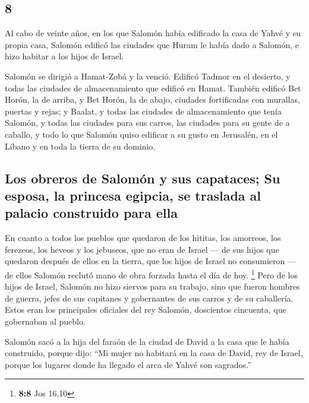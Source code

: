 \begin{paracol}{2}
\hypertarget{section-14}{%
\section{8}\label{section-14}}

 Al cabo de veinte años, en los que Salomón había
edificado la casa de Yahvé y su propia casa,  Salomón
edificó las ciudades que Huram le había dado a Salomón, e hizo habitar a
los hijos de Israel.

 Salomón se dirigió a Hamat-Zobá y la venció.
 Edificó Tadmor en el desierto, y todas las ciudades de
almacenamiento que edificó en Hamat.  También edificó Bet
Horón, la de arriba, y Bet Horón, la de abajo, ciudades fortificadas con
murallas, puertas y rejas;  y Baalat, y todas las ciudades
de almacenamiento que tenía Salomón, y todas las ciudades para sus
carros, las ciudades para su gente de a caballo, y todo lo que Salomón
quiso edificar a su gusto en Jerusalén, en el Líbano y en toda la tierra
de su dominio.

\hypertarget{los-obreros-de-salomuxf3n-y-sus-capataces-su-esposa-la-princesa-egipcia-se-traslada-al-palacio-construido-para-ella}{%
\subsection{Los obreros de Salomón y sus capataces; Su esposa, la
princesa egipcia, se traslada al palacio construido para
ella}\label{los-obreros-de-salomuxf3n-y-sus-capataces-su-esposa-la-princesa-egipcia-se-traslada-al-palacio-construido-para-ella}}

 En cuanto a todos los pueblos que quedaron de los
hititas, los amorreos, los ferezeos, los heveos y los jebuseos, que no
eran de Israel ---  de sus hijos que quedaron después de
ellos en la tierra, que los hijos de Israel no consumieron --- de ellos
Salomón reclutó mano de obra forzada hasta el día de hoy. \footnote{\textbf{8:8}
  Jos 16,10}  Pero de los hijos de Israel, Salomón no hizo
siervos para su trabajo, sino que fueron hombres de guerra, jefes de sus
capitanes y gobernantes de sus carros y de su caballería.
 Estos eran los principales oficiales del rey Salomón,
doscientos cincuenta, que gobernaban al pueblo.

 Salomón sacó a la hija del faraón de la ciudad de David
a la casa que le había construido, porque dijo: ``Mi mujer no habitará
en la casa de David, rey de Israel, porque los lugares donde ha llegado
el arca de Yahvé son sagrados.''


\end{paracol}
